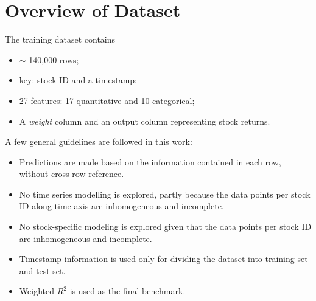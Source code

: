 \documentclass[
11pt, %
a4paper, %
oneside, %
headinclude,footinclude, %
BCOR5mm, %
]{scrartcl}
\begin{document}
\listoffigures %

\listoftables %




{\let\thefootnote\relax{}}



\newpage %


\section{Overview of Dataset}
The training dataset contains 
\begin{itemize}[noitemsep]
\item $\sim$ 140,000 rows;
\item key: stock ID and a timestamp;
\item 27 features: 17 quantitative and 10 categorical;
\item A \textit{weight} column and an output column representing stock returns.
\end{itemize}
A few general guidelines are followed in this work:
\begin{itemize}[noitemsep]
\item Predictions are made based on the information contained in each row, without cross-row reference.
\item No time series modelling is explored, partly because the data points per stock ID along time axis are inhomogeneous and incomplete.
\item No stock-specific modeling is explored given that the data points per stock ID are inhomogeneous and incomplete.
\item Timestamp information is used only for dividing the dataset into training set and test set.
\item Weighted $R^2$ is used as the final benchmark.
\end{itemize}
\end{document}
